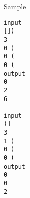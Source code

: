 Sample
\begin{verbatim}
input 
[]) 
3 
0 ) 
0 ( 
0 ( 
output 
0 
2 
6 

input 
(] 
3 
1 ) 
0 ) 
0 ( 
output 
0 
0 
2 
\end{verbatim}

 